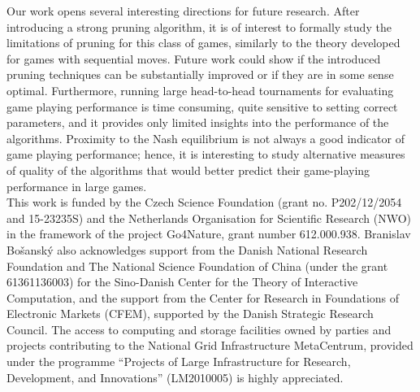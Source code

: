 Our work opens several interesting directions for future research. After introducing a strong pruning algorithm, it is of interest to formally study the limitations of pruning for this class of games, similarly to the theory developed for games with sequential moves. Future work could show if the introduced pruning techniques can be substantially improved or if they are in some sense optimal. 
Furthermore, running large head-to-head tournaments for evaluating game playing performance is time consuming, quite sensitive to setting correct parameters, and it provides only limited insights into the performance of the algorithms. Proximity to the Nash equilibrium is not always a good indicator of game playing performance; hence, it is interesting to study alternative measures of quality of the algorithms that would better predict their game-playing performance in large games. \\

 This work is funded by the Czech Science Foundation (grant no. P202/12/2054 and 15-23235S) and the Netherlands
Organisation for Scientific Research (NWO) in the framework of the project Go4Nature, grant number 612.000.938.
Branislav Bo{\v s}ansk{\' y} also acknowledges support from the Danish National Research Foundation and The National Science Foundation of China (under the grant 61361136003) for the Sino-Danish Center for the Theory of Interactive Computation, and the support
from the Center for Research in Foundations of Electronic Markets (CFEM), supported by the Danish Strategic Research Council.
The access to computing and storage facilities owned by parties and projects contributing to the National Grid
Infrastructure MetaCentrum, provided under the
programme ``Projects of Large Infrastructure for Research, Development, and Innovations'' (LM2010005) is highly appreciated.

